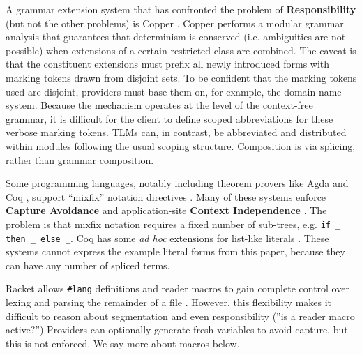 \documentclass[acmsmall]{acmart}
\newcommand{\li}[1]{\lstinline[basicstyle=\ttfamily\fontsize{9pt}{1em}\selectfont]{#1}}
\begin{document}
A grammar extension system that has confronted the problem of \textbf{Responsibility} (but not the other problems) is Copper \cite{conf/pldi/SchwerdfegerW09,schwerdfeger2010context}. Copper performs a modular grammar analysis that guarantees that determinism is conserved (i.e. ambiguities are not possible) when extensions of a certain restricted class are combined. The caveat is that the constituent extensions must prefix all newly introduced forms with marking tokens drawn from disjoint sets. To be confident that the marking tokens used are disjoint, providers must base them on, for example, the domain name system. Because the mechanism operates at the level of the context-free grammar, it is difficult for the client to define scoped abbreviations for these verbose marking tokens. TLMs can, in contrast, be abbreviated and distributed within modules following the usual scoping structure. Composition is via splicing, rather than grammar composition.

Some programming languages, notably including theorem provers like Agda \cite{norell2007towards} and Coq \cite{Coq:manual}, support ``mixfix'' notation directives \cite{wieland2009parsing,missura1997higher,5134}. Many of these systems enforce \textbf{Capture Avoidance} and application-site \textbf{Context Independence} \cite{5134,DBLP:conf/gpce/TahaJ03,Coq:manual,DBLP:conf/ifl/DanielssonN08}. The problem is that mixfix notation requires a fixed number of sub-trees, e.g. \li{if _ then _ else _}. Coq has some \emph{ad hoc} extensions for list-like literals \cite{Coq:manual}. These systems cannot express the example literal forms from this paper, because they can have any number of spliced terms.

Racket allows \li{#lang} definitions and reader macros to gain complete control over lexing and parsing the remainder of a file \cite{Flatt:2012:CLR:2063176.2063195}. However, this flexibility makes it difficult to reason about segmentation and even responsibility (''is a reader macro active?'') Providers can optionally generate fresh variables to avoid capture, but this is not enforced. We say more about macros below.
\end{document}
